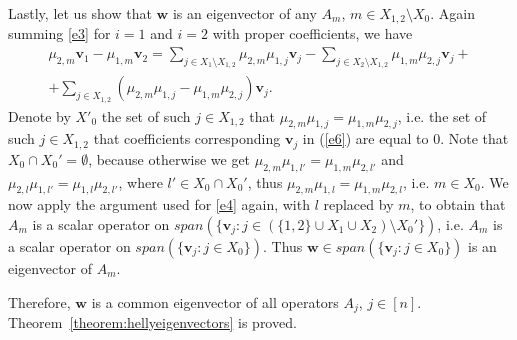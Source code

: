 \documentclass[12pt,nopagetitle]{article}
\theoremstyle{plain}
\theoremstyle{definition}
\begin{document}
Lastly, let us show that $\mathbf w$ is an eigenvector of any $A_m$, $m\in X_{1,2}\setminus X_0$. 
Again summing \eqref{e3} for $i=1$ and $i=2$ with proper coefficients, we have
\begin{multline}\label{e6}
\mu_{2,m} \mathbf v_1-\mu_{1,m} \mathbf v_2=\sum_{j\in X_1\setminus X_{1,2}} \mu_{2,m}\mu_{1,j} \mathbf v_j-\sum_{j\in X_2\setminus X_{1,2}} \mu_{1,m}\mu_{2,j} \mathbf v_j+\\
+\sum_{j\in X_{1,2}}(\mu_{2,m}\mu_{1,j}-\mu_{1,m}\mu_{2,j}) \mathbf v_j.
\end{multline}
Denote by $X'_0$ the set of such $j\in X_{1,2}$ that $\mu_{2,m}\mu_{1,j}=\mu_{1,m}\mu_{2,j}$, i.e. the set of such $j\in X_{1,2}$ that coefficients corresponding $\mathbf v_j$ in (\ref{e6}) are equal to $0$. Note that $X_0\cap X_0'=\emptyset$, because otherwise we get $\mu_{2,m}\mu_{1,l'}=\mu_{1,m}\mu_{2,l'}$ and $\mu_{2,l} \mu_{1,l'}=\mu_{1,l}\mu_{2,l'}$, where $l'\in X_0\cap X_0'$, thus $\mu_{2,m}\mu_{1,l}=\mu_{1,m}\mu_{2,l}$, i.e. $m\in X_0$. We now apply the argument  used for \eqref{e4} again, with $l$ replaced by $m$, to obtain that $A_m$ is a scalar operator on $span(\{\mathbf v_j:j\in(\{1,2\}\cup X_1\cup X_2)\setminus X_0'\})$, i.e. $A_m$ is a scalar operator on $span(\{\mathbf v_j:j\in X_0\})$. Thus $\mathbf w\in span(\{\mathbf v_j:j\in X_0\})$ is an eigenvector of $A_m$.

Therefore, $\mathbf w$ is a common eigenvector of all operators $A_j$, $j\in [n]$. Theorem~\ref{theorem:hellyeigenvectors} is proved.
    
\end{document}
